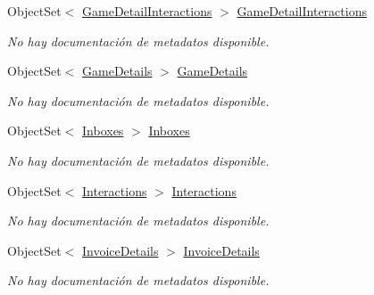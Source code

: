 \begin{DoxyCompactItemize}
Object\-Set$<$ \hyperlink{class_game_memory_1_1_game_detail_interactions}{Game\-Detail\-Interactions} $>$ \hyperlink{class_game_memory_1_1_o_m_k_t_d_b_entities_a1a8d11e4033053188744d00ca1cf9f2a}{Game\-Detail\-Interactions}
\begin{DoxyCompactList}\small\item\em No hay documentación de metadatos disponible. \end{DoxyCompactList}\item 
Object\-Set$<$ \hyperlink{class_game_memory_1_1_game_details}{Game\-Details} $>$ \hyperlink{class_game_memory_1_1_o_m_k_t_d_b_entities_af835cabeefdbea910bd796314d96732a}{Game\-Details}
\begin{DoxyCompactList}\small\item\em No hay documentación de metadatos disponible. \end{DoxyCompactList}\item 
Object\-Set$<$ \hyperlink{class_game_memory_1_1_inboxes}{Inboxes} $>$ \hyperlink{class_game_memory_1_1_o_m_k_t_d_b_entities_a0097ac435c8cf12e633cba5d3416830e}{Inboxes}
\begin{DoxyCompactList}\small\item\em No hay documentación de metadatos disponible. \end{DoxyCompactList}\item 
Object\-Set$<$ \hyperlink{class_game_memory_1_1_interactions}{Interactions} $>$ \hyperlink{class_game_memory_1_1_o_m_k_t_d_b_entities_a90bece0c772b8feda0e88ac32ae0ac27}{Interactions}
\begin{DoxyCompactList}\small\item\em No hay documentación de metadatos disponible. \end{DoxyCompactList}\item 
Object\-Set$<$ \hyperlink{class_game_memory_1_1_invoice_details}{Invoice\-Details} $>$ \hyperlink{class_game_memory_1_1_o_m_k_t_d_b_entities_a43ee16477b00b7f5df26049a7d1f7995}{Invoice\-Details}
\begin{DoxyCompactList}\small\item\em No hay documentación de metadatos disponible. \end{DoxyCompactList}\item 

\end{DoxyCompactItemize}
